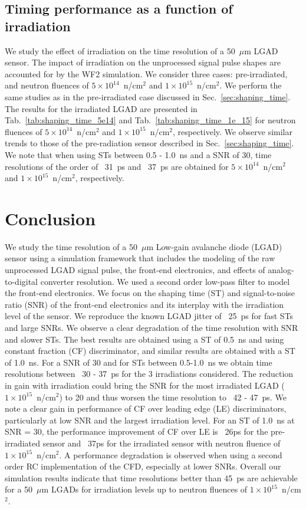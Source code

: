 \documentclass[preprint,1p]{elsarticle}
\begin{document}
\subsection{Timing performance as a function of irradiation}\label{sec:rad_tolerance}
We study the effect of irradiation on the time resolution of a 50~$\mu$m LGAD sensor. The impact of irradiation on the unprocessed
signal pulse shapes are accounted for by the WF2 simulation. We consider three cases: pre-irradiated, and neutron fluences of
$5\times 10^{14}$~n/cm$^2$ and $1\times 10^{15}$~n/cm$^2$. We perform the same studies as in the pre-irradiated case discussed in
Sec.~\ref{sec:shaping_time}. The results for the irradiated LGAD are presented in Tab.~\ref{tab:shaping_time_5e14} and
Tab.~\ref{tab:shaping_time_1e_15} for neutron fluences of
$5\times 10^{14}$~n/cm$^2$ and $1\times 10^{15}$~n/cm$^2$, respectively.
We observe similar trends to those of the pre-radiation sensor described in
Sec.~\ref{sec:shaping_time}. We note that when using STs between 0.5 - 1.0~\si{ns} and a SNR of 30, time resolutions of the order
of ~31~\si{ps} and ~37~\si{ps} are obtained for $5\times 10^{14}$~n/cm$^2$ and $1\times 10^{15}$~n/cm$^2$, respectively.

\section{Conclusion}\label{sec:conclusion}


We study the time resolution of a 50~$\mu$m Low-gain avalanche diode (LGAD) sensor using a simulation framework that includes the
modeling of the raw unprocessed LGAD signal pulse, the front-end electronics, and effects of analog-to-digital converter resolution.
We used a second order low-pass filter to model the front-end electronics. 
We focus on the shaping time (ST) and signal-to-noise ratio (SNR) of the front-end electronics and its interplay
with the irradiation level of the sensor. We reproduce the known LGAD jitter of ~25~\si{ps}
for fast STs and large SNRs. We observe a clear degradation of the time resolution with SNR and slower STs. The best results are
obtained using a ST of 0.5~\si{ns} and using constant fraction (CF) discriminator, and similar results are obtained with a ST of 1.0~\si{ns}. For a SNR of 30
and for STs between 0.5-1.0~\si{ns} we obtain time resolutions between ~30 - 37~\si{ps} for the 3 irradiations considered. The
reduction in gain with irradiation could bring the SNR for the most irradiated LGAD ($1\times 10^{15}$~n/cm$^2$) to 20 and thus
worsen the time resolution to ~42 - 47~\si{ps}. We note a clear gain in performance of CF over leading edge (LE) discriminators, particularly at
low SNR and the largest irradiation level. For an ST of 1.0~\si{ns} at SNR = 30, the performance improvement of CF over LE
is ~26\si{ps} for the pre-irradiated sensor and ~37\si{ps} for the irradiated sensor with neutron fluence of
$1\times 10^{15}$~n/cm$^2$. A performance degradation is observed when using a {\color{red}second order RC} implementation of the CFD,
especially at lower SNRs. Overall our simulation results indicate that time resolutions better than
45~\si{ps} are achievable for a 50~$\mu$m LGADs for irradiation levels up to neutron fluences of $1\times 10^{15}$~n/cm$^2$.
\end{document}
